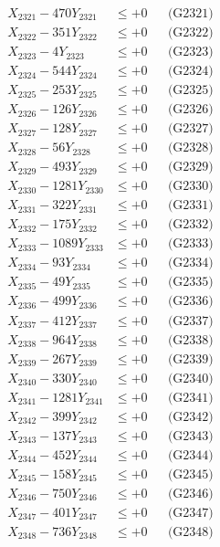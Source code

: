 \documentclass[a4paper,10pt]{article}
\begin{document}
{\begin{align}
\allowbreak
X_{2321} - 470Y_{2321} &\leq +0 && \text{(G2321)} \\
X_{2322} - 351Y_{2322} &\leq +0 && \text{(G2322)} \\
X_{2323} - 4Y_{2323} &\leq +0 && \text{(G2323)} \\
X_{2324} - 544Y_{2324} &\leq +0 && \text{(G2324)} \\
X_{2325} - 253Y_{2325} &\leq +0 && \text{(G2325)} \\
X_{2326} - 126Y_{2326} &\leq +0 && \text{(G2326)} \\
X_{2327} - 128Y_{2327} &\leq +0 && \text{(G2327)} \\
X_{2328} - 56Y_{2328} &\leq +0 && \text{(G2328)} \\
X_{2329} - 493Y_{2329} &\leq +0 && \text{(G2329)} \\
X_{2330} - 1281Y_{2330} &\leq +0 && \text{(G2330)} \\
\allowbreak
X_{2331} - 322Y_{2331} &\leq +0 && \text{(G2331)} \\
X_{2332} - 175Y_{2332} &\leq +0 && \text{(G2332)} \\
X_{2333} - 1089Y_{2333} &\leq +0 && \text{(G2333)} \\
X_{2334} - 93Y_{2334} &\leq +0 && \text{(G2334)} \\
X_{2335} - 49Y_{2335} &\leq +0 && \text{(G2335)} \\
X_{2336} - 499Y_{2336} &\leq +0 && \text{(G2336)} \\
X_{2337} - 412Y_{2337} &\leq +0 && \text{(G2337)} \\
X_{2338} - 964Y_{2338} &\leq +0 && \text{(G2338)} \\
X_{2339} - 267Y_{2339} &\leq +0 && \text{(G2339)} \\
X_{2340} - 330Y_{2340} &\leq +0 && \text{(G2340)} \\
\allowbreak
X_{2341} - 1281Y_{2341} &\leq +0 && \text{(G2341)} \\
X_{2342} - 399Y_{2342} &\leq +0 && \text{(G2342)} \\
X_{2343} - 137Y_{2343} &\leq +0 && \text{(G2343)} \\
X_{2344} - 452Y_{2344} &\leq +0 && \text{(G2344)} \\
X_{2345} - 158Y_{2345} &\leq +0 && \text{(G2345)} \\
X_{2346} - 750Y_{2346} &\leq +0 && \text{(G2346)} \\
X_{2347} - 401Y_{2347} &\leq +0 && \text{(G2347)} \\
X_{2348} - 736Y_{2348} &\leq +0 && \text{(G2348)} \\

\end{align}}
\end{document}

